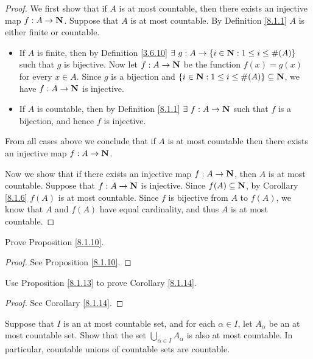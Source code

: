 \begin{proof}
    We first show that if \(A\) is at most countable, then there exists an injective map \(f : A \to \mathbf{N}\).
    Suppose that \(A\) is at most countable.
    By Definition \ref{8.1.1} \(A\) is either finite or countable.
    \begin{itemize}
        \item If \(A\) is finite, then by Definition \ref{3.6.10} \(\exists\ g : A \to \{i \in \mathbf{N} : 1 \leq i \leq \#(A)\}\) such that \(g\) is bijective.
              Now let \(f : A \to \mathbf{N}\) be the function \(f(x) = g(x)\) for every \(x \in A\).
              Since \(g\) is a bijection and \(\{i \in \mathbf{N} : 1 \leq i \leq \#(A)\} \subseteq \mathbf{N}\), we have \(f : A \to \mathbf{N}\) is injective.
        \item If \(A\) is countable, then by Definition \ref{8.1.1} \(\exists\ f : A \to \mathbf{N}\) such that \(f\) is a bijection, and hence \(f\) is injective.
    \end{itemize}
    From all cases above we conclude that if \(A\) is at most countable then there exists an injective map \(f : A \to \mathbf{N}\).

    Now we show that if there exists an injective map \(f : A \to \mathbf{N}\), then \(A\) is at most countable.
    Suppose that \(f : A \to \mathbf{N}\) is injective.
    Since \(f(A) \subseteq \mathbf{N}\), by Corollary \ref{8.1.6} \(f(A)\) is at most countable.
    Since \(f\) is bijective from \(A\) to \(f(A)\), we know that \(A\) and \(f(A)\) have equal cardinality, and thus \(A\) is at most countable.
\end{proof}

\begin{exercise}\label{ex 8.1.7}
    Prove Proposition \ref{8.1.10}.
\end{exercise}

\begin{proof}
    See Proposition \ref{8.1.10}.
\end{proof}

\begin{exercise}\label{ex 8.1.8}
    Use Proposition \ref{8.1.13} to prove Corollary \ref{8.1.14}.
\end{exercise}

\begin{proof}
    See Corollary \ref{8.1.14}.
\end{proof}

\begin{exercise}\label{ex 8.1.9}
    Suppose that \(I\) is an at most countable set, and for each \(\alpha \in I\), let \(A_{\alpha}\) be an at most countable set.
    Show that the set \(\bigcup_{\alpha \in I} A_{\alpha}\) is also at most countable.
    In particular, countable unions of countable sets are countable.
\end{exercise}

